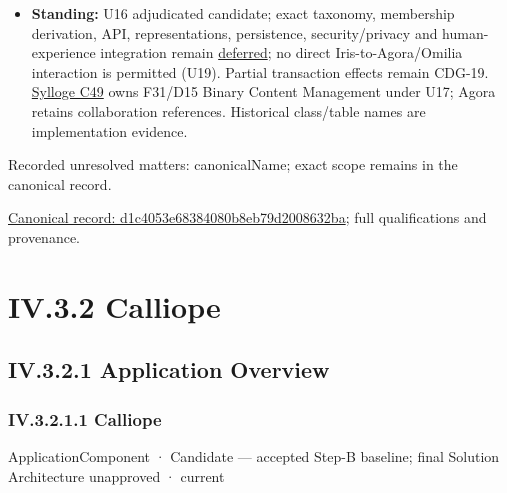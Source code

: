 \begin{itemize}
\item \textbf{Standing:} U16 adjudicated candidate; exact taxonomy, membership derivation,
  API, representations, persistence, security/privacy and human-experience
  integration remain \hyperref[element:d1c4053e68384080b8eb79d2008632ba]{deferred};
  no direct Iris-to-Agora/Omilia interaction is permitted (U19).
  Partial transaction effects remain CDG-19. \hyperref[element:feea742463b84021b66853d287d8916f]{Sylloge C49} owns F31/D15
  Binary Content Management under U17; Agora retains collaboration references.
  Historical class/table names are implementation evidence.

\end{itemize}

{\small Recorded unresolved matters: canonicalName; exact scope remains in the canonical record.}\par
{\footnotesize \href{../../../../continuum/application/application-component/d1c4053e68384080b8eb79d2008632ba.md}{Canonical record: d1c4053e68384080b8eb79d2008632ba}; full qualifications and provenance.}\par
\section*{IV.3.2 Calliope}
\label{navigation:IV.3.2}

\subsection*{IV.3.2.1 Application Overview}
\label{navigation:IV.3.2.1}

\subsubsection*{IV.3.2.1.1 Calliope}
\label{navigation:IV.3.2.1.1}

\label{element:466ad8f75a954c0581b5bba090443849}
{\small ApplicationComponent · Candidate — accepted Step-B baseline; final Solution Architecture unapproved · current}\par

